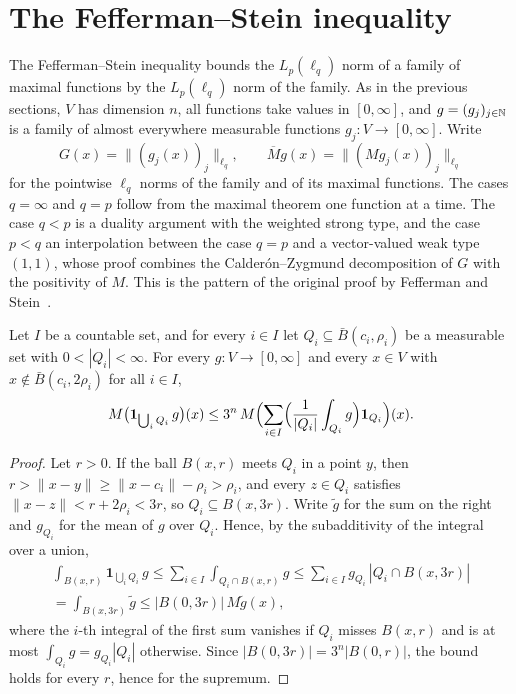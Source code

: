 \section{The Fefferman--Stein inequality}

The Fefferman--Stein inequality bounds the $L_p(\ell_q)$ norm of a family of maximal functions
by the $L_p(\ell_q)$ norm of the family. As in the previous sections, $V$ has dimension $n$, all
functions take values in $[0, \infty]$, and $g = (g_j)_{j \in \mathbb{N}}$ is a family of almost
everywhere measurable functions $g_j : V \to [0, \infty]$. Write
\[
  G(x) = \|(g_j(x))_j\|_{\ell_q}, \qquad \overline M g(x) = \|(M g_j(x))_j\|_{\ell_q}
\]
for the pointwise $\ell_q$ norms of the family and of its maximal functions.
The cases $q = \infty$ and $q = p$ follow from the maximal theorem one function at a time. The
case $q < p$ is a duality argument with the weighted strong type, and the case $p < q$ an
interpolation between the case $q = p$ and a vector-valued weak type $(1,1)$, whose proof
combines the Calder\'on--Zygmund decomposition of $G$ with the positivity of $M$. This is the
pattern of the original proof by Fefferman and Stein~\cite{FeffermanStein}.

\begin{lemma}
\label{lem:maximal-off-enlarged}
\leanok
{}
Let $I$ be a countable set, and for every $i \in I$ let $Q_i \subseteq \bar B(c_i, \rho_i)$ be
a measurable set with $0 < |Q_i| < \infty$. For every $g : V \to [0, \infty]$ and every
$x \in V$ with $x \notin \bar B(c_i, 2 \rho_i)$ for all $i \in I$,
\[
  M\bigl(\mathbf 1_{\bigcup_i Q_i} \, g\bigr)(x)
  \leq 3^n \, M\Bigl( \sum_{i \in I} \Bigl( \frac{1}{|Q_i|} \int_{Q_i} g \Bigr)
    \mathbf 1_{Q_i} \Bigr)(x) .
\]
\end{lemma}

\begin{proof}
\leanok
Let $r > 0$. If the ball $B(x, r)$ meets $Q_i$ in a point $y$, then
$r > \|x - y\| \geq \|x - c_i\| - \rho_i > \rho_i$, and every $z \in Q_i$ satisfies
$\|x - z\| < r + 2 \rho_i < 3 r$, so $Q_i \subseteq B(x, 3r)$. Write $\tilde g$ for the sum on
the right and $g_{Q_i}$ for the mean of $g$ over $Q_i$. Hence, by the subadditivity of the
integral over a union,
\begin{multline*}
  \int_{B(x, r)} \mathbf 1_{\bigcup_i Q_i} \, g
  \leq \sum_{i \in I} \int_{Q_i \cap B(x, r)} g
  \leq \sum_{i \in I} g_{Q_i} \, |Q_i \cap B(x, 3r)| \\
  = \int_{B(x, 3r)} \tilde g
  \leq |B(0, 3r)| \, M \tilde g(x),
\end{multline*}
where the $i$-th integral of the first sum vanishes if $Q_i$ misses $B(x, r)$ and is at most
$\int_{Q_i} g = g_{Q_i} |Q_i|$ otherwise.
Since $|B(0, 3r)| = 3^n |B(0, r)|$, the bound holds for every $r$, hence for the supremum.
\end{proof}

